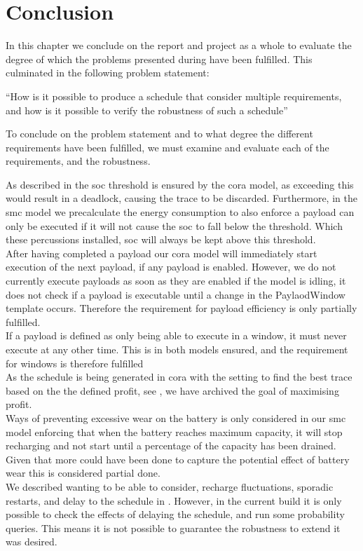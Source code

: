 \chapter{Conclusion} \label{sec:conclusion}
In this chapter we conclude on the report and project as a whole to evaluate the degree of which the problems presented during   have been fulfilled. This culminated in the following problem statement:

\enquote{How is it possible to produce a schedule that consider multiple requirements, and how is it possible to verify the robustness of such a schedule}

To conclude on the problem statement and to what degree the different requirements have been fulfilled, we must examine and evaluate each of the requirements, and the robustness.

As described in  the \gls{soc} threshold is ensured by the \gls{cora} model, as exceeding this would result in a deadlock, causing the trace to be discarded. Furthermore, in the \gls{smc} model we precalculate the energy consumption to also enforce a payload can only be executed if it will not cause the \gls{soc} to fall below the threshold.  Which these percussions installed, \gls{soc} will always be kept above this threshold.\\
After having completed a payload our \gls{cora} model will immediately start execution of the next payload, if any payload is enabled. However, we do not currently execute payloads as soon as they are enabled if the model is idling, it does not check if a payload is executable until a change in the PaylaodWindow template occurs. Therefore the requirement for payload efficiency is only partially fulfilled.\\
If a payload is defined as only being able to execute in a window, it must never execute at any other time. This is in both models ensured, and the requirement for windows is therefore fulfilled \\
As the schedule is being generated in \gls{cora} with the setting to find the best trace based on the the defined profit, see , we have archived the goal of maximising profit.\\
Ways of preventing excessive wear on the battery is only considered in our \gls{smc} model enforcing that when the battery reaches maximum capacity, it will stop recharging and not start until a percentage of the capacity has been drained. Given that more could have been done to capture the potential effect of battery wear this is considered partial done. \\
We described wanting to be able to consider, recharge fluctuations, sporadic restarts, and delay to the schedule in . However, in the current build it is only possible to check the effects of delaying the schedule, and run some probability queries. This means it is not possible to guarantee the robustness to extend it was desired.

